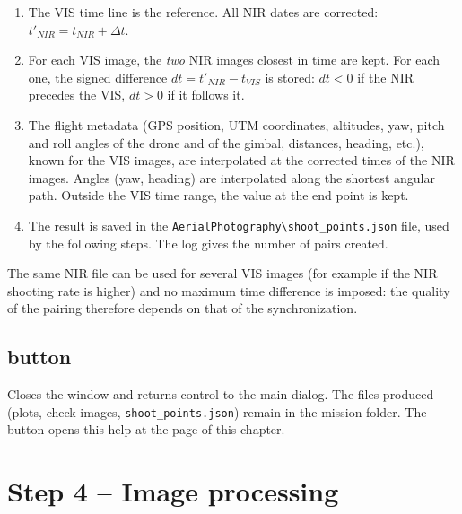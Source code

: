 \documentclass[a4paper,11pt]{report}
\DeclareRobustCommand{\bouton}[1]{\texorpdfstring{\fbox{\small\textsf{#1}}}{#1}}
\begin{document}
\begin{enumerate}
  \item The VIS time line is the reference. All NIR dates are corrected: $t'_{NIR} = t_{NIR} + \Delta t$.
  \item For each VIS image, the \emph{two} NIR images closest in time are kept. For each one, the signed difference $dt = t'_{NIR} - t_{VIS}$ is stored: $dt<0$ if the NIR precedes the VIS, $dt>0$ if it follows it.
  \item The flight metadata (GPS position, UTM coordinates, altitudes, yaw, pitch and roll angles of the drone and of the gimbal, distances, heading, etc.), known for the VIS images, are interpolated at the corrected times of the NIR images. Angles (yaw, heading) are interpolated along the shortest angular path. Outside the VIS time range, the value at the end point is kept.
  \item The result is saved in the \texttt{AerialPhotography\textbackslash shoot\_points.json} file, used by the following steps. The log gives the number of pairs created.
\end{enumerate}
The same NIR file can be used for several VIS images (for example if the NIR shooting rate is higher) and no maximum time difference is imposed: the quality of the pairing therefore depends on that of the synchronization.

\section{\bouton{Close} button}\label{btn:step3_close}
Closes the window and returns control to the main dialog. The files produced (plots, check images, \texttt{shoot\_points.json}) remain in the mission folder. The \bouton{?} button opens this help at the page of this chapter.

\chapter{Step 4 -- Image processing}\label{ch:step4}
\end{document}
